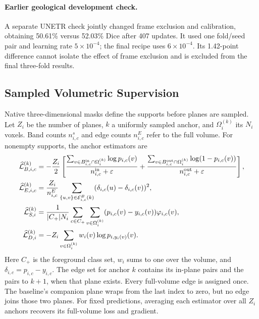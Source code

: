 \documentclass[12pt,a4paper]{article}
\begin{document}
\paragraph{Earlier geological development check.}\label{sec:geo-development}
A separate UNETR check jointly changed frame exclusion and calibration,
obtaining 50.61\% versus 52.03\% Dice after 407
updates. It used one fold/seed pair and learning rate $5\times10^{-4}$;
the final recipe uses $6\times10^{-4}$. Its 1.42-point difference
cannot isolate the effect of frame exclusion and is excluded from the
final three-fold results.

\subsection{Sampled Volumetric Supervision}
\label{sec:sampled-pretrained-supervision}

Native three-dimensional masks define the supports before planes are
sampled. Let $Z_i$ be the number of planes, $k$ a uniformly sampled
anchor, and $\Omega_i^{(k)}$ its $N_i$ voxels. Band counts $n_{i,c}^s$
and edge counts $n_{i,c}^E$ refer to the full volume. For nonempty
supports, the anchor estimators are
\begin{align}
\widehat{\mathcal L}_{B,i,c}^{(k)}
 &=-\frac{Z_i}{2}\left[
 \frac{\sum_{v\in B_{i,c}^{\rm in}\cap\Omega_i^{(k)}}\log p_{i,c}(v)}{n_{i,c}^{\rm in}+\varepsilon}
 +\frac{\sum_{v\in B_{i,c}^{\rm out}\cap\Omega_i^{(k)}}\log(1-p_{i,c}(v))}{n_{i,c}^{\rm out}+\varepsilon}
 \right],\label{eq:medsam-sampled-band-loss}\\
\widehat{\mathcal L}_{E,i,c}^{(k)}
 &=\frac{Z_i}{n_{i,c}^E}\sum_{\{u,v\}\in\mathcal E_{i,c}^B(k)}
 (\delta_{i,c}(u)-\delta_{i,c}(v))^2,\label{eq:medsam-sampled-edge-loss}\\
\widehat{\mathcal L}_{S,i}^{(k)}
 &=\frac{1}{|C_+|N_i}\sum_{c\in C_+}\sum_{v\in\Omega_i^{(k)}}
 (p_{i,c}(v)-y_{i,c}(v))\varphi_{i,c}(v),\label{eq:medsam-sampled-sdf}\\
\widehat{\mathcal L}_{D,i}^{(k)}
 &=-Z_i\sum_{v\in\Omega_i^{(k)}}w_i(v)\log p_{i,y_i(v)}(v).
 \label{eq:medsam-sampled-depth}
\end{align}
Here $C_+$ is the foreground class set, $w_i$ sums to one over the
volume, and $\delta_{i,c}=p_{i,c}-y_{i,c}$. The edge set for anchor $k$
contains its in-plane pairs and the pairs to $k+1$, when that plane
exists. Every full-volume edge is assigned once. The baseline's
companion plane wraps from the last index to zero, but no edge joins
those two planes. For fixed predictions, averaging each estimator over
all $Z_i$ anchors recovers its full-volume loss and gradient.
\end{document}

